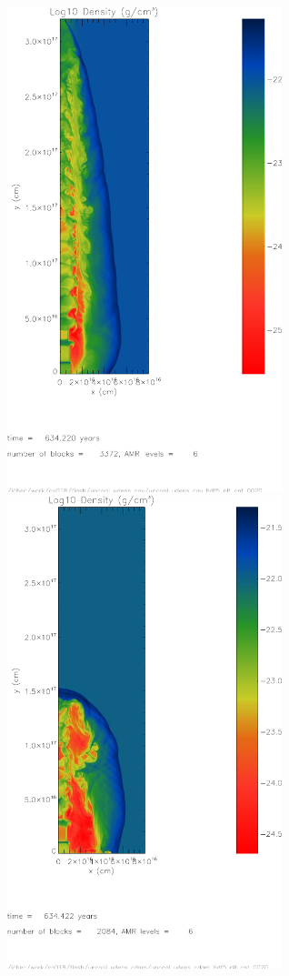 \begin{figure}[t]
\begin{center}
   \begin{minipage}[t]{.48\linewidth}
\includegraphics[width=8cm]{flash_ud10_cav}
   \end{minipage} \hfill
   \begin{minipage}[t]{.48\linewidth}
\includegraphics[width=8cm]{flash_ud_cav}

\end{minipage}
\end{center}
\end{figure}
